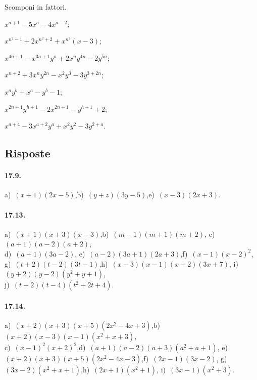 \begin{esercizio}[\Ast]
 \label{ese:17.45}
 Scomponi in fattori.
 \begin{multicols}{2}
 \begin{enumeratea}
  \item $x^{a+1}-5x^{a}-4x^{a-2}$;
\item $x^{n^{2}-1}+2x^{n^{2}+2}+x^{n^{2}}(x-3)$;
\item $x^{4n+1}-x^{3n+1}y^{n}+2x^{n}y^{4n}-2y^{5n}$;
\item $x^{n+2}+3x^{n}y^{2n}-x^{2}y^{3}-3y^{3+2n}$;
\item $x^{a}y^{b}+x^{a}-y^{b}-1$;
\item $x^{2n+1}y^{h+1}-2x^{2n+1}-y^{h+1}+2$;
\item $x^{a+4}-3x^{a+2}y^{a}+x^{2}y^{2}-3y^{2+a}$.
 \end{enumeratea}
 \end{multicols}
\end{esercizio}

\subsection{Risposte}
\paragraph{17.9.} a)~$(x+1)(2x-5)$,\quad b)~$(y+z)(3y-5)$,\quad e)~$(x-3)\left(2x+3\right)$.

\paragraph{17.13.} a)~$(x+1)(x+3)\left(x-3\right)$,\quad b)~$(m-1)(m+1)\left(m+2\right)$,\quad
c)~$(a+1)(a-2)\left(a+2\right)$,\quad \protect\\
d)~$(a+1)\left(3a-2\right)$,\quad
e)~$(a-2)(3a+1)\left(2a+3\right)$,\quad f)~$(x-1)(x-2)^{2}$,\quad
g)~$(t+2)(t-2)\left(3t-1\right)$,\quad h)~$(x-3)(x-1)(x+2)(3x+7)$,\quad
i)~$(y+2)(y-2)\left(y^{2}+y+1\right)$,\quad
\protect\\j)~$(t+2)(t-4)\left(t^{2}+2t+4\right)$.

\paragraph{17.14.} a)~$(x+2)(x+3)(x+5)\left(2x^{2}-4x+3\right)$,\quad b)~$(x+2)(x-3)(x-1)\left(x^{2}+x+3\right)$,\quad
\protect\\ c)~$(x-1)^{2}\left(x+2\right)^{2}$,\quad d)~$(a+1)(a-2)(a+3)(a^{2}+a+1)$,\quad
e)~$(x+2)(x+3)(x+5)(2x^{2}-4x-3)$,\quad f)~$(2x-1)(3x-2)$,\quad
g)~$(3x-2)\left(x^{2}+x+1\right)$,\quad h)~$(2x+1)\left(x^{2}+1\right)$,\quad
i)~$(3x-1)\left(x^{2}+3\right)$.

